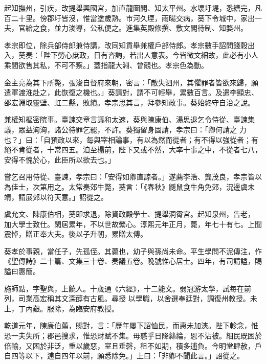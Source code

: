 \begin{pinyinscope}
 起知撫州，引疾，改提舉興國宮，加直龍圖閣、知太平州。水壞圩堤，悉繕完，凡百二十里。傍郡圩皆沒，惟當塗歲熟。市河久堙，雨暘交病，葵下令城中，家出一夫，官給之食，並力浚導，公私便之。進集英殿修撰、敷文閣待制、知婺州。



 孝宗即位，除兵部侍郎兼侍講，改同知貢舉兼權戶部侍郎。孝宗數手詔問錢穀出入，葵奏：「陛下勞心庶政，日有咨詢，若出人意表。今皆微文細故，此必有小人
 乘間欲售其私，不可不察。」蓋指龍大淵、曾覿也。孝宗色為動。



 金主亮為其下所斃，張浚自督府來朝，密言：「敵失泗州，其懼罪者皆欲來歸，願遣軍渡淮赴之，此恢復之機也。」葵請對，謂不可輕舉，累數百言。及遣李顯忠、邵宏淵取靈壁、虹二縣，敗績。孝宗思其言，拜參知政事。葵始終守自治之說。



 兼權知樞密院事。臺諫交章言議和太速，葵與陳康伯、湯思退乞令侍從、臺諫集議，眾益洶洶，諸公待罪乞罷，不許。葵獨留身固請，孝宗曰：「卿何請之
 力也？」曰：「自預政以來，每與宰相論事，有以為然而從者；有不得以強從者；有絕不肯從者，十常四五。洎至榻前，陛下又或不然，大率十事之中，不從者七八，安得不愧於心，此臣所以欲去也。」



 嘗乞召用侍從、臺諫，孝宗曰：「安得如卿直諒者。」遂薦李浩、龔茂良，孝宗皆以為佳士，次第用之。太常奏郊牛斃，葵言：「《春秋》鼷鼠食牛角免郊，況邊虞未靖，請展郊以符天意。」詔從之。



 虞允文、陳康伯相，葵即求退，除資政殿學士、提舉洞霄宮。起知泉州，告老，
 加大學士致仕。閑居累年，不以世故縈心。淳熙元年正月，薨，年七十有七。上聞震悼，贈正奉大夫。後以子升朝，累贈太傅。



 葵孝於事親，當任子，先孤侄。其薨也，幼子與孫尚未命。平生學問不泥傳注，作《聖傳詩》二十篇、文集三十卷、奏議五卷。晚號惟心居士。四年，有司請謚，賜謚曰惠簡。



 施師點，字聖與，上饒人。十歲通《六經》，十二能文。弱冠游太學，試每在前列，司業高宏稱其文深醇有古風。尋授
 以學職，以舍選奉廷對，調復州教授。未上，丁內艱。服除，為臨安府教授。



 乾道元年，陳康伯薦，賜對，言：「歷年屢下詔恤民，而惠未加浹。陛下軫念，惟恐一夫失所；郡邑搜求，惟恐財賦不集。毋惑乎日降絲綸，恩不沾被。細民既困於倍輸，又困於非泛，重以歲惡，室且垂磬，租不如期，積多逋負。今明堂肆赦，戶自四等以下，逋自四年以前，願悉除免。」上曰：「非卿不聞此言。」詔從之。




\end{pinyinscope}
